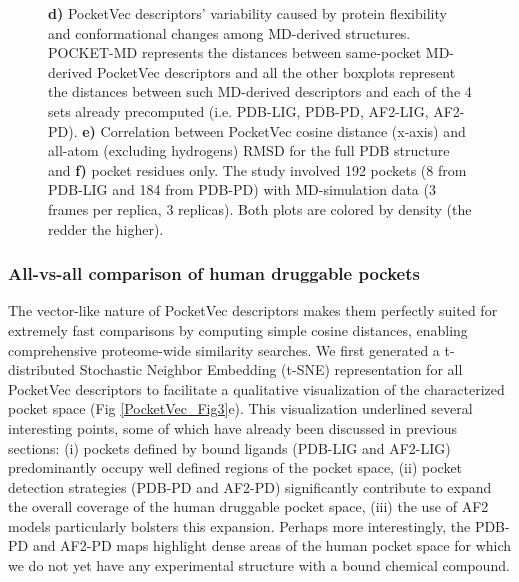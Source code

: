 \begin{figure}[H]
{    \textbf{d)} PocketVec descriptors’ variability caused by protein flexibility and conformational changes among MD-derived structures. POCKET-MD represents the distances between same-pocket MD-derived PocketVec descriptors and all the other boxplots represent the distances between such MD-derived descriptors and each of the 4 sets already precomputed (i.e. PDB-LIG, PDB-PD, AF2-LIG, AF2-PD).
    \textbf{e)} Correlation between PocketVec cosine distance (x-axis) and all-atom (excluding hydrogens) RMSD for the full PDB structure and
    \textbf{f)} pocket residues only. The study involved 192 pockets (8 from PDB-LIG and 184 from PDB-PD) with MD-simulation data (3 frames per replica, 3 replicas). Both plots are colored by density (the redder the higher).
  }
  \label{PocketVec_Fig4}
\end{figure}



\subsubsection{All-vs-all comparison of human druggable pockets}
\label{PocketVec_ResultsAndDiscussion_All_vs_All_comparison_human_druggable_pockets}

The vector-like nature of PocketVec descriptors makes them perfectly suited for extremely fast comparisons by computing simple cosine distances, enabling comprehensive proteome-wide similarity searches. We first generated a t-distributed Stochastic Neighbor Embedding (t-SNE) representation for all PocketVec descriptors to facilitate a qualitative visualization of the characterized pocket space (Fig \ref{PocketVec_Fig3}e). This visualization underlined several interesting points, some of which have already been discussed in previous sections: (i) pockets defined by bound ligands (PDB-LIG and AF2-LIG) predominantly occupy well defined regions of the pocket space, (ii) pocket detection strategies (PDB-PD and AF2-PD) significantly contribute to expand the overall coverage of the human druggable pocket space, (iii) the use of AF2 models particularly bolsters this expansion. Perhaps more interestingly, the PDB-PD and AF2-PD maps highlight dense areas of the human pocket space for which we do not yet have any experimental structure with a bound chemical compound.

